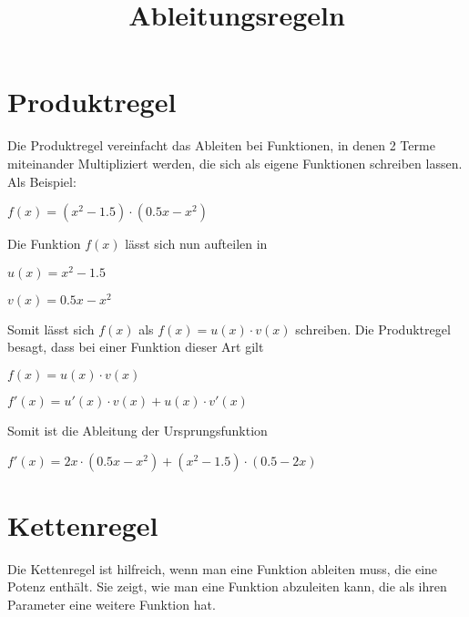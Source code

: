 \documentclass[10pt,a4paper]{article}
\begin{document}
\setlength{\parindent}{0cm}

\title{Ableitungsregeln}

\makeatletter
\def\@maketitle{%
  \newpage
  \null
  \vskip 2em%
  \begin{center}%
  \let \footnote \thanks
    {\Huge\bfseries\@title \par}%
    \vskip 1.5em%
    {\large
      \lineskip .5em%
      \begin{tabular}[t]{c}%
        \@author
      \end{tabular}\par}%
    \vskip 1em%
    {\large \@date}%
  \end{center}%
  \par
  \vskip 1.5em}
\makeatother

\author{}
\date{}

\maketitle

\section*{Produktregel}
Die Produktregel vereinfacht das Ableiten bei Funktionen, in denen 2 Terme
miteinander Multipliziert werden, die sich als eigene Funktionen schreiben lassen.
Als Beispiel:

$f(x) = (x^2 - 1.5) \cdot (0.5x - x^2)$

Die Funktion $f(x)$ lässt sich nun aufteilen in

$u(x) = x^2 - 1.5$

$v(x) = 0.5x - x^2$

Somit lässt sich $f(x)$ als $f(x) = u(x) \cdot v(x)$ schreiben.
Die Produktregel besagt, dass bei einer Funktion dieser Art gilt

$f(x) = u(x) \cdot v(x)$

$f'(x) = u'(x) \cdot v(x) + u(x) \cdot v'(x)$

Somit ist die Ableitung der Ursprungsfunktion

$f'(x) = 2x \cdot (0.5x - x^2) + (x^2 - 1.5) \cdot (0.5 - 2x)$

\section*{Kettenregel}

Die Kettenregel ist hilfreich, wenn man eine Funktion ableiten muss, die eine Potenz enthält.
Sie zeigt, wie man eine Funktion abzuleiten kann, die als ihren Parameter eine weitere Funktion hat.
\end{document}

